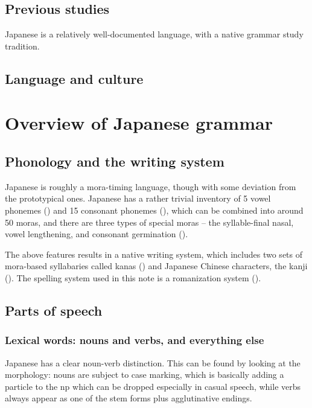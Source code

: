 \documentclass[UTF8, a4paper, oneside, scheme=plain]{ctexrep}
\begin{document}
\section{Previous studies}

Japanese is a relatively well-documented language,
with a native grammar study tradition.

\section{Language and culture}

\chapter{Overview of Japanese grammar}


\section{Phonology and the writing system}

Japanese is roughly a mora-timing language,
though with some deviation from the prototypical ones.
Japanese has a rather trivial inventory of 5 vowel phonemes () 
and 15 consonant phonemes (),
which can be combined into around 50 moras,
and there are three types of special moras -- 
the syllable-final nasal, vowel lengthening, and consonant germination 
().

The above features results in a native writing system,
which includes two sets of mora-based syllabaries called kanas ()
and Japanese Chinese characters, the kanji ().
The spelling system used in this note is a romanization system ().

\section{Parts of speech}

\subsection{Lexical words: nouns and verbs, and everything else}\label{sec:lexical-word-overview}

Japanese has a clear noun-verb distinction.
This can be found by looking at the morphology:
nouns are subject to case marking,
which is basically adding a particle to the \acs{np} 
which can be dropped especially in casual speech,
while verbs always appear as one of the stem forms plus agglutinative endings.
\end{document}
